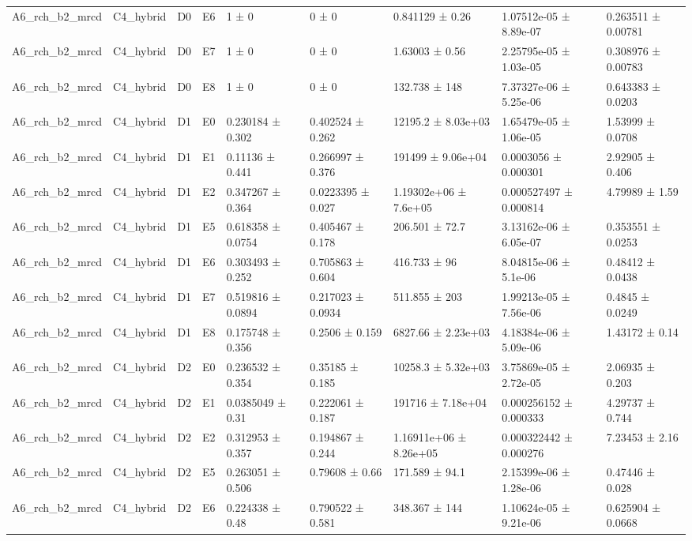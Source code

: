 \begin{table}
\begin{tabular}{lllllllll}
A6\_rch\_b2\_mrcd & C4\_hybrid & D0 & E6 & 1 ± 0 & 0 ± 0 & 0.841129 ± 0.26 & 1.07512e-05 ± 8.89e-07 & 0.263511 ± 0.00781 \\
A6\_rch\_b2\_mrcd & C4\_hybrid & D0 & E7 & 1 ± 0 & 0 ± 0 & 1.63003 ± 0.56 & 2.25795e-05 ± 1.03e-05 & 0.308976 ± 0.00783 \\
A6\_rch\_b2\_mrcd & C4\_hybrid & D0 & E8 & 1 ± 0 & 0 ± 0 & 132.738 ± 148 & 7.37327e-06 ± 5.25e-06 & 0.643383 ± 0.0203 \\
A6\_rch\_b2\_mrcd & C4\_hybrid & D1 & E0 & 0.230184 ± 0.302 & 0.402524 ± 0.262 & 12195.2 ± 8.03e+03 & 1.65479e-05 ± 1.06e-05 & 1.53999 ± 0.0708 \\
A6\_rch\_b2\_mrcd & C4\_hybrid & D1 & E1 & 0.11136 ± 0.441 & 0.266997 ± 0.376 & 191499 ± 9.06e+04 & 0.0003056 ± 0.000301 & 2.92905 ± 0.406 \\
A6\_rch\_b2\_mrcd & C4\_hybrid & D1 & E2 & 0.347267 ± 0.364 & 0.0223395 ± 0.027 & 1.19302e+06 ± 7.6e+05 & 0.000527497 ± 0.000814 & 4.79989 ± 1.59 \\
A6\_rch\_b2\_mrcd & C4\_hybrid & D1 & E5 & 0.618358 ± 0.0754 & 0.405467 ± 0.178 & 206.501 ± 72.7 & 3.13162e-06 ± 6.05e-07 & 0.353551 ± 0.0253 \\
A6\_rch\_b2\_mrcd & C4\_hybrid & D1 & E6 & 0.303493 ± 0.252 & 0.705863 ± 0.604 & 416.733 ± 96 & 8.04815e-06 ± 5.1e-06 & 0.48412 ± 0.0438 \\
A6\_rch\_b2\_mrcd & C4\_hybrid & D1 & E7 & 0.519816 ± 0.0894 & 0.217023 ± 0.0934 & 511.855 ± 203 & 1.99213e-05 ± 7.56e-06 & 0.4845 ± 0.0249 \\
A6\_rch\_b2\_mrcd & C4\_hybrid & D1 & E8 & 0.175748 ± 0.356 & 0.2506 ± 0.159 & 6827.66 ± 2.23e+03 & 4.18384e-06 ± 5.09e-06 & 1.43172 ± 0.14 \\
A6\_rch\_b2\_mrcd & C4\_hybrid & D2 & E0 & 0.236532 ± 0.354 & 0.35185 ± 0.185 & 10258.3 ± 5.32e+03 & 3.75869e-05 ± 2.72e-05 & 2.06935 ± 0.203 \\
A6\_rch\_b2\_mrcd & C4\_hybrid & D2 & E1 & 0.0385049 ± 0.31 & 0.222061 ± 0.187 & 191716 ± 7.18e+04 & 0.000256152 ± 0.000333 & 4.29737 ± 0.744 \\
A6\_rch\_b2\_mrcd & C4\_hybrid & D2 & E2 & 0.312953 ± 0.357 & 0.194867 ± 0.244 & 1.16911e+06 ± 8.26e+05 & 0.000322442 ± 0.000276 & 7.23453 ± 2.16 \\
A6\_rch\_b2\_mrcd & C4\_hybrid & D2 & E5 & 0.263051 ± 0.506 & 0.79608 ± 0.66 & 171.589 ± 94.1 & 2.15399e-06 ± 1.28e-06 & 0.47446 ± 0.028 \\
A6\_rch\_b2\_mrcd & C4\_hybrid & D2 & E6 & 0.224338 ± 0.48 & 0.790522 ± 0.581 & 348.367 ± 144 & 1.10624e-05 ± 9.21e-06 & 0.625904 ± 0.0668 \\

\end{tabular}
\end{table}
